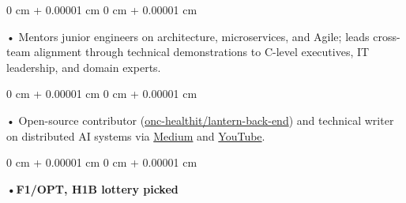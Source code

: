 \documentclass[10pt, letterpaper]{article}
\newenvironment{onecolentry}{
    \begin{adjustwidth}{
        0 cm + 0.00001 cm
    }{
        0 cm + 0.00001 cm
    }
}{
    \end{adjustwidth}
} %
\begin{document}
        \begin{onecolentry}
            • Mentors junior engineers on architecture, microservices, and Agile; leads cross-team alignment through technical demonstrations to C-level executives, IT leadership, and domain experts.
        \end{onecolentry}
        \begin{onecolentry}
            • Open-source contributor (\href{https://github.com/onc-healthit/lantern-back-end}{onc-healthit/lantern-back-end}) and technical writer on distributed AI systems via \href{https://medium.com/@sreenikethaathreya}{Medium} and \href{https://www.youtube.com/@sreenikethaathreya7555}{YouTube}.
        \end{onecolentry}
        \begin{onecolentry}
                \textbf{•F1/OPT, H1B lottery picked}
        \end{onecolentry}

    \vspace{2 pt }
\end{document}
